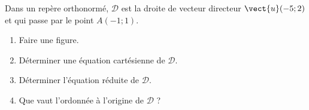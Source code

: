 \documentclass[a4paper]{article}
\begin{document}
\smallskip

\exo[4 points] Dans un repère orthonormé, $\mathcal{D}$ est la droite de vecteur directeur $\vect{u}(-5;2)$ et qui passe par le point $A(-1;1)$.
\begin{enumerate}
  \item Faire une figure.
  \item Déterminer une équation cartésienne de $\mathcal{D}$.
  \item Déterminer l'équation réduite de $\mathcal{D}$.
  \item Que vaut l'ordonnée à l'origine de $\mathcal{D}$ ?
\end{enumerate}
\end{document}
